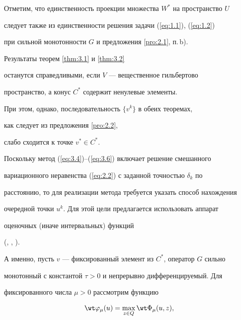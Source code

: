 Отметим, что единственность проекции множества $W^*$ на пространство $U$ 


следует также из единственности решения задачи (\ref{eq:1.1}), (\ref{eq:1.2})


при сильной монотонности $G$ и предложения \ref{pro:2.1}, п.\,b).





\begin{note}


Результаты теорем \ref{thm:3.1} и \ref{thm:3.2} 


останутся справедливыми, если $V$ --- вещественное гильбертово


пространство, а конус $C^*$ содержит ненулевые элементы.


При этом, однако, последовательность $ \{v^{k} \} $ в обеих теоремах,


как следует из предложения \ref{pro:2.2}, 


слабо сходится к точке $v^* \in C^*$. 


\end{note}





Поскольку метод (\ref{eq:3.4})--(\ref{eq:3.6}) включает решение смешанного 


вариационного неравенства (\ref{eq:2.2}) с заданной точностью $\delta_{k}$ по 


расстоянию, то для реализации метода требуется указать способ нахождения 


очередной точки $u^{k}$. Для этой цели предлагается использовать аппарат 


оценочных (иначе интервальных) функций


(\cite{Pat97}, \cite{Kon99}, \cite{Pat99}).





А именно, пусть $v$ --- фиксированный элемент из $C^*$, оператор $G$ сильно 


монотонный с константой $\tau >0$ и непрерывно дифференцируемый. Для 


фиксированного числа $\mu >0$ рассмотрим функцию 


\begin{equation} \label{eq:3.8} 


\wt \varphi_{\mu} (u)=\max_{z \in Q} \wt \Phi_{\mu} (u, z), 


\end{equation}


